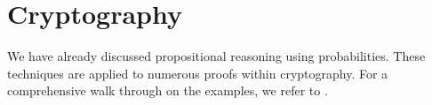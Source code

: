 \section{Cryptography}
We have already discussed propositional reasoning using probabilities.
These techniques are applied to numerous proofs within cryptography.
For a comprehensive walk through on the examples, we refer to \cite{Petcher:2015}.